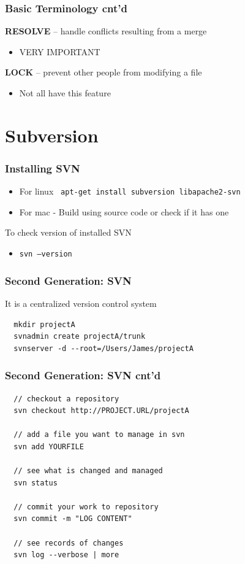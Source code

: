 \documentclass[newPxFont,sthlmFooter,nooffset]{beamer}
\begin{document}
\begin{frame}[t]
  \frametitle{Basic Terminology cnt'd}
\textbf{RESOLVE} – handle conflicts resulting from a merge
\begin{itemize}
\item VERY IMPORTANT
\end{itemize}


\textbf{LOCK} – prevent other people from modifying a file
\begin{itemize}
\item Not all have this feature
\end{itemize}
\end{frame}

\section{Subversion}



\begin{frame}[t]
  \frametitle{Installing SVN}

  \begin{itemize}
  \item For linux       \texttt{ apt-get install subversion libapache2-svn}
  \item For mac - Build using source code or check if it has one
  \end{itemize}

To check version of installed SVN
\begin{itemize}
\item \texttt{svn --version}
\end{itemize}
\end{frame}


\begin{frame}[fragile,t]
  \frametitle{Second Generation: SVN}
It is a centralized version control system

\begin{verbatim}
  mkdir projectA
  svnadmin create projectA/trunk
  svnserver -d --root=/Users/James/projectA
\end{verbatim}

\end{frame}


\begin{frame}[fragile,t]
  \frametitle{Second Generation: SVN cnt'd}

\begin{verbatim}
  // checkout a repository
  svn checkout http://PROJECT.URL/projectA

  // add a file you want to manage in svn
  svn add YOURFILE

  // see what is changed and managed
  svn status

  // commit your work to repository
  svn commit -m "LOG CONTENT"

  // see records of changes
  svn log --verbose | more
\end{verbatim}

\end{frame}
\end{document}
